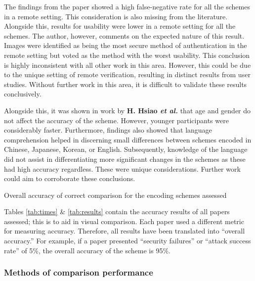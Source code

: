 The findings from the paper showed a high false-negative rate for all the schemes in a remote setting. This consideration is also missing from the literature. Alongside this, results for usability were lower in a remote setting for all the schemes. The author, however, comments on the expected nature of this result.\\
Images were identified as being the most secure method of authentication in the remote setting but voted as the method with the worst usability. This conclusion is highly inconsistent with all other work in this area. However, this could be due to the unique setting of remote verification, resulting in distinct results from user studies. Without further work in this area, it is difficult to validate these results conclusively.

Alongside this, it was shown in work by \textbf{H. Hsiao \textit{et al.}}\cite{hsiao2009study} that age and gender do not affect the accuracy of the scheme. However, younger participants were considerably faster. Furthermore, findings also showed that language comprehension helped in discerning small differences between schemes encoded in Chinese, Japanese, Korean, or English. Subsequently, knowledge of the language did not assist in differentiating more significant changes in the schemes as these had high accuracy regardless. These were unique considerations. Further work could aim to corroborate these conclusions.

\begin{table}[h!]
    \centering
    \resizebox{.8\textwidth}{!}{%

        \makebox[\textwidth][c]{
            
        }%
    }
    \caption{Overall accuracy of correct comparison for the encoding schemes assessed}
    \label{tab:results}
\end{table}

Tables \ref{tab:times} \& \ref{tab:results} contain the accuracy results of all papers assessed; this is to aid in visual comparison. Each paper used a different metric for measuring accuracy. Therefore, all results have been translated into ``overall accuracy.'' For example, if a paper presented ``security failures'' or ``attack success rate'' of 5\%, the overall accuracy of the scheme is 95\%.

\subsubsection*{Methods of comparison performance}

